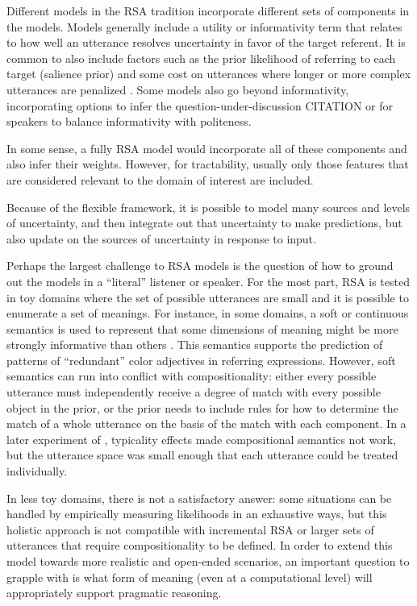 \documentclass[]{article}
\begin{document}
Different models in the RSA tradition incorporate different sets of components in the models. Models generally include a utility or informativity term that relates to how well an utterance resolves uncertainty in favor of the target referent.  It is common to also include factors such as the prior likelihood of referring to each target (salience prior) and some cost on utterances where longer or more complex utterances are penalized \cite{goodman2016}. Some models also go beyond informativity, incorporating options to infer the question-under-discussion CITATION or for speakers to balance informativity with politeness.

In some sense, a fully RSA model would incorporate all of these components and also infer their weights. However, for tractability, usually only those features that are considered relevant to the domain of interest are included.

Because of the flexible framework, it is possible to model many sources and levels of uncertainty, and then integrate out that uncertainty to make predictions, but also update on the sources of uncertainty in response to input. 

Perhaps the largest challenge to RSA models is the question of how to ground out the models in a ``literal'' listener or speaker. For the most part, RSA is tested in toy domains where the set of possible utterances are small and it is possible to enumerate a set of meanings. For instance, in some domains, a soft or continuous semantics is used to represent that some dimensions of meaning might be more strongly informative than others \cite{degen20200406}. This semantics supports the prediction of patterns of ``redundant'' color adjectives in referring expressions. However, soft semantics can run into conflict with compositionality: either every possible utterance must independently receive a degree of match with every possible object in the prior, or the prior needs to include rules for how to determine the match of a whole utterance on the basis of the match with each component. In a later experiment of \cite{degen20200406}, typicality effects made compositional semantics not work, but the utterance space was small enough that each utterance could be treated individually. 

 In less toy domains, there is not a satisfactory answer: some situations can be handled by empirically measuring likelihoods in an exhaustive ways, but this holistic approach is not compatible with incremental RSA or larger sets of utterances that require compositionality to be defined. In order to extend this model towards more realistic and open-ended scenarios, an important question to grapple with is what form of meaning (even at a computational level) will appropriately support pragmatic reasoning. 
 
\end{document}

